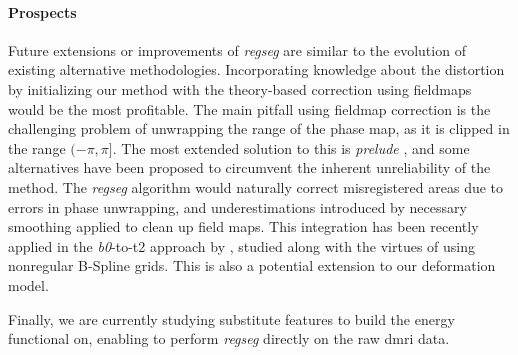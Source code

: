 \paragraph*{Prospects}
Future extensions or improvements of \emph{regseg} are similar to the evolution of existing
  alternative methodologies.
Incorporating knowledge about the distortion by initializing our method with the theory-based
  correction using fieldmaps would be the most profitable.
The main pitfall using fieldmap correction is the challenging problem of unwrapping the
  range of the phase map, as it is clipped in the range $(-\pi, \pi]$.
The most extended solution to this is \emph{prelude} \citep{jenkinson_fast_2003}, and some
  alternatives have been proposed \citep{zhou_reliable_2009,daga_susceptibility_2014} to
  circumvent the inherent unreliability of the method.
The \emph{regseg} algorithm would naturally correct misregistered areas due to errors in
  phase unwrapping, and underestimations introduced by necessary smoothing
  applied to clean up field maps.
This integration has been recently applied in the \emph{b0}-to-\gls*{t2} approach
  by \cite{irfanoglu_susceptibility_2011}, studied along with the virtues of using
  nonregular B-Spline grids.
This is also a potential extension to our deformation model.

Finally, we are currently studying substitute features to build the energy functional on,
  enabling to perform \emph{regseg} directly on the raw \gls*{dmri} data.